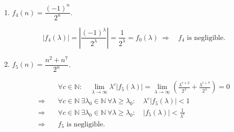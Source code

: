 \documentclass[12pt,a4paper]{article}
\begin{document}
\begin{problem}
\begin{enumerate}
\item $f_4(n)=\dfrac{(-1)^n}{2^n}$.
\begin{solution}
\[
|f_4(\lambda)|
=\left|\frac{(-1)^\lambda}{2^\lambda}\right|
=\frac{1}{2^\lambda}
=f_0(\lambda)
\ \Longrightarrow\quad f_4\text{ is negligible}.
\]
\end{solution}
\item $f_5(n)=\dfrac{n^2+n^7}{2^n}$.
\begin{solution}
\[
\begin{aligned}
&\forall c\in\mathbb{N}:\quad
\lim_{\lambda\to\infty}\lambda^c|f_5(\lambda)|
=\lim_{\lambda\to\infty}
\left(\frac{\lambda^{c+2}}{2^\lambda}
+\frac{\lambda^{c+7}}{2^\lambda}\right)=0\\
\Longrightarrow\quad
&\forall c\in\mathbb{N}\ \exists\lambda_0\in\mathbb{N}\
\forall\lambda\ge\lambda_0:
\quad\lambda^c|f_5(\lambda)|<1\\
\Longrightarrow\quad
&\forall c\in\mathbb{N}\ \exists\lambda_0\in\mathbb{N}\
\forall\lambda\ge\lambda_0:
\quad |f_5(\lambda)|<\frac{1}{\lambda^c}\\
\Longrightarrow\quad
&f_5\text{ is negligible}.
\end{aligned}
\]
\end{solution}
\end{enumerate}
\end{problem}
\end{document}
